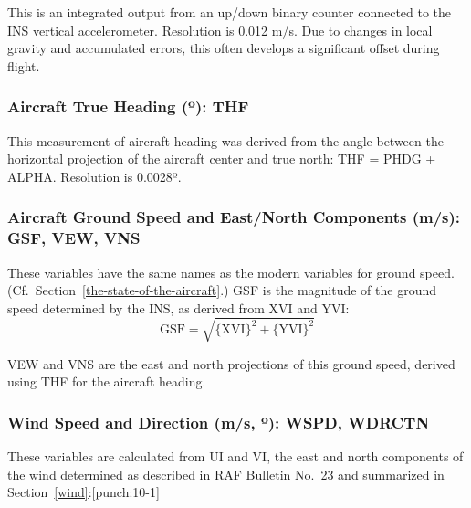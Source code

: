\documentclass[
  english,
]{book}
\begin{document}
This is an integrated output from an up/down binary counter connected to the INS vertical accelerometer. Resolution is 0.012 m/s. Due to changes in local gravity and accumulated errors, this often develops a significant offset during flight.

\hypertarget{thf}{%
\subsubsection*{\texorpdfstring{Aircraft True Heading ({º}): THF}{Aircraft True Heading (º): THF}}\label{thf}}

This measurement of aircraft heading was derived from the angle between the horizontal projection of the aircraft center and true north: THF = PHDG + ALPHA. Resolution is 0.0028{º}.

\hypertarget{gsf-obsolete}{%
\subsubsection*{Aircraft Ground Speed and East/North Components (m/s): GSF, VEW, VNS}\label{gsf-obsolete}}

These variables have the same names as the modern variables for ground speed. (Cf.~Section~\ref{the-state-of-the-aircraft}.) GSF is the magnitude of the ground speed determined by the INS, as derived from XVI and YVI:\\

\begin{equation}
\mathrm{GSF=\sqrt{\{XVI\}^{2}+\{YVI\}^{2}}}
\label{eq:GSF}
\end{equation}

VEW and VNS are the east and north projections of this ground speed, derived using THF for the aircraft heading.

\hypertarget{wspd}{%
\subsubsection*{\texorpdfstring{Wind Speed and Direction (m/s, {º}): WSPD, WDRCTN}{Wind Speed and Direction (m/s, º): WSPD, WDRCTN}}\label{wspd}}

These variables are calculated from UI and VI, the east and north components of the wind determined as described in RAF Bulletin No.~23 and summarized in Section~\ref{wind}:\protect\hypertarget{punch:10-1}{}{{[}punch:10-1{]}}
\end{document}
